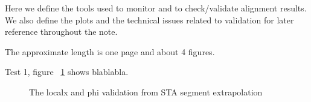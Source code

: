 Here we define the tools used to monitor and to check/validate alignment results. We also 
define the plots and the technical issues related to validation for later reference throughout 
the note.  
 
The approximate length is one page and about 4 figures. 

Test 1, figure ~\ref{fig:valid_DTconsts} shows blablabla.
\begin{figure}[h!]
  \centering
  \label{fig:valid_DTconsts}
  \caption{The localx and phi validation from STA segment extrapolation }
\end{figure}
 
